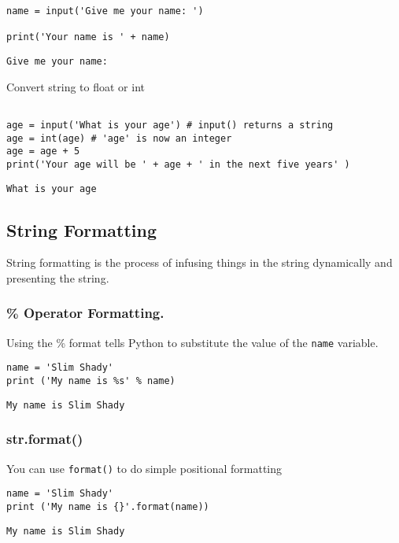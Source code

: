 \documentclass[11pt]{article}
\begin{document}
\begin{verbatim}
name = input('Give me your name: ')

print('Your name is ' + name)
\end{verbatim}

\begin{verbatim}
Give me your name: 
\end{verbatim}




Convert string to float or int

\begin{verbatim}

age = input('What is your age') # input() returns a string
age = int(age) # 'age' is now an integer
age = age + 5
print('Your age will be ' + age + ' in the next five years' )
\end{verbatim}
\begin{verbatim}
What is your age
\end{verbatim}

\subsection{String Formatting}
\label{sec:org3e4a4c8}
String formatting is the process of infusing things in the string dynamically and presenting the string.
\subsubsection{\% Operator Formatting.}
\label{sec:orgb615f5b}
Using the \% format tells Python to substitute the value of the \texttt{name} variable.
\begin{verbatim}
name = 'Slim Shady'
print ('My name is %s' % name)
\end{verbatim}

\begin{verbatim}
My name is Slim Shady
\end{verbatim}

\subsubsection{str.format()}
\label{sec:orgef2dae7}
You can use \texttt{format()} to do simple positional formatting
\begin{verbatim}
name = 'Slim Shady'
print ('My name is {}'.format(name))
\end{verbatim}

\begin{verbatim}
My name is Slim Shady
\end{verbatim}
\end{document}
